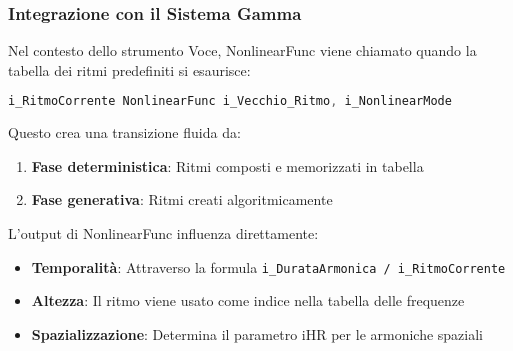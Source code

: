 \subsubsection{Integrazione con il Sistema Gamma}
Nel contesto dello strumento Voce, NonlinearFunc viene chiamato quando la tabella dei ritmi predefiniti si esaurisce:

\begin{lstlisting}[language=C]
i_RitmoCorrente NonlinearFunc i_Vecchio_Ritmo, i_NonlinearMode
\end{lstlisting}

Questo crea una transizione fluida da:
\begin{enumerate}
    \item \textbf{Fase deterministica}: Ritmi composti e memorizzati in tabella
    \item \textbf{Fase generativa}: Ritmi creati algoritmicamente
\end{enumerate}
L'output di NonlinearFunc influenza direttamente:
\begin{itemize}
    \item \textbf{Temporalità}: Attraverso la formula \texttt{i\_DurataArmonica / i\_RitmoCorrente}
    \item \textbf{Altezza}: Il ritmo viene usato come indice nella tabella delle frequenze
    \item \textbf{Spazializzazione}: Determina il parametro iHR per le armoniche spaziali
\end{itemize}